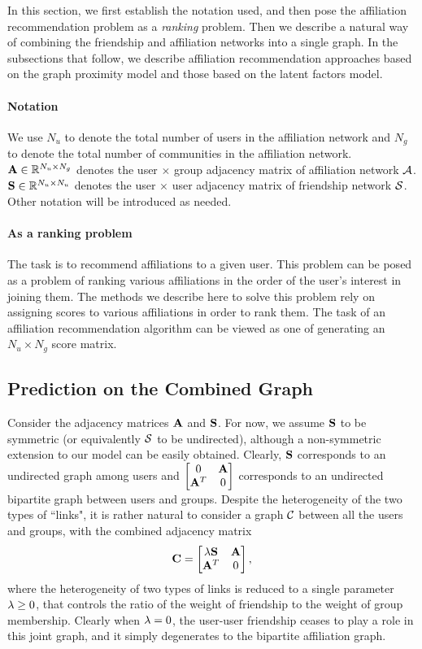 In this section, we first establish the notation used, and then pose the affiliation recommendation problem as a \emph{ranking} problem. Then we describe a natural way of combining the friendship and affiliation networks into a single graph. In the subsections that follow, we describe affiliation recommendation approaches based on the graph proximity model and those based on the latent factors model.

\paragraph*{Notation}
We use $N_u$ to denote the total number of users in the affiliation network and $N_g$ to denote the total number of communities in the affiliation network. $\mathbf{A} \in \mathbb{R}^{N_u \times N_g}$ denotes the user $\times$ group adjacency matrix of affiliation network $\mathcal{A}$. $\mathbf{S} \in \mathbb{R}^{N_u \times N_u}$ denotes the user $\times$ user adjacency matrix of friendship network $\mathcal{S}$. Other notation will be introduced as needed.

\paragraph*{As a ranking problem}
The task is to recommend affiliations to a given user. This problem can be posed as a problem of ranking various affiliations in the order of the user's interest in joining them. The methods we describe here to solve this problem rely on assigning scores to various affiliations in order to rank them. The task of an affiliation recommendation algorithm can be viewed as one of generating an $N_u \times N_g$ score matrix. 

\subsection{Prediction on the Combined Graph}
Consider the adjacency matrices $\mathbf{A}$ and $\mathbf{S}$. For now, we assume $\mathbf{S}$ to be symmetric (or equivalently $\mathcal{S}$ to be undirected), although a non-symmetric extension to our model can be easily obtained. Clearly, $\mathbf{S}$ corresponds to an undirected graph among users and $\begin{bmatrix}
 0 & \mathbf{A} \\
\mathbf{A}^T & 0
\end{bmatrix}$
corresponds to an undirected bipartite graph between users and groups. Despite the heterogeneity of the two types of ``links", it is rather natural to consider a graph $\mathcal{C}$ between all the users and groups, with the combined adjacency matrix
\[\mathbf{C} =
\begin{bmatrix}
\lambda \mathbf{S} & \mathbf{A} \\
\mathbf{A}^T & 0
\end{bmatrix},
\label{e:C}
\]
where the heterogeneity of two types of links is reduced to a single parameter $\lambda \geq 0$, that controls the ratio of the weight of friendship to the weight of group membership. Clearly when $\lambda = 0$, the user-user friendship ceases to play a role in this joint graph, and it simply degenerates to the bipartite affiliation graph.

